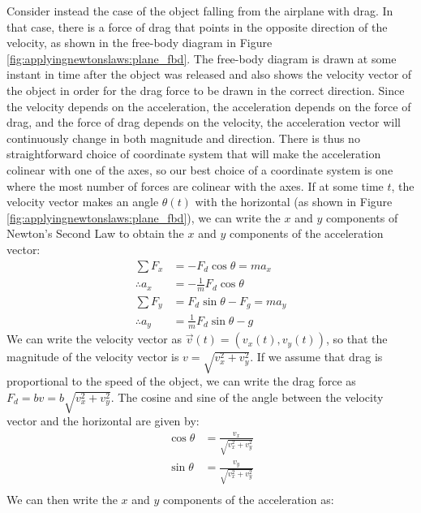 Consider instead the case of the object falling from the airplane with drag. In that case, there is a force of drag that points in the opposite direction of the velocity, as shown in the free-body diagram in Figure \ref{fig:applyingnewtonslaws:plane_fbd}. The free-body diagram is drawn at some instant in time after the object was released and also shows the velocity vector of the object in order for the drag force to be drawn in the correct direction. 
Since the velocity depends on the acceleration, the acceleration depends on the force of drag, and the force of drag depends on the velocity, the acceleration vector will continuously change in both magnitude and direction. There is thus no straightforward choice of coordinate system that will make the acceleration colinear with one of the axes, so our best choice of a coordinate system is one where the most number of forces are colinear with the axes. If at some time $t$, the velocity vector makes an angle $\theta(t)$ with the horizontal (as shown in Figure \ref{fig:applyingnewtonslaws:plane_fbd}), we can write the $x$ and $y$ components of Newton's Second Law to obtain the $x$ and $y$ components of the acceleration vector:
\begin{align*}
\sum F_x &= -F_d\cos\theta = ma_x \\
\therefore a_x &= -\frac{1}{m}F_d\cos\theta\\
\sum F_y &= F_d\sin\theta-F_g = ma_y \\
\therefore a_y &= \frac{1}{m}F_d\sin\theta-g
\end{align*}
We can write the velocity vector as $\vec v(t) = (v_x(t), v_y(t))$, so that the magnitude of the velocity vector is $v=\sqrt{v_x^2+v_y^2}$. If we assume that drag is proportional to the speed of the object, we can write the drag force as $F_d = bv=b\sqrt{v_x^2+v_y^2}$. The cosine and sine of the angle between the velocity vector and the horizontal are given by:
\begin{align*}
\cos\theta &= \frac{v_x}{\sqrt{v_x^2+v_y^2}}\\
\sin\theta &= \frac{v_y}{\sqrt{v_x^2+v_y^2}}\\
\end{align*}
We can then write the $x$ and $y$ components of the acceleration as:
